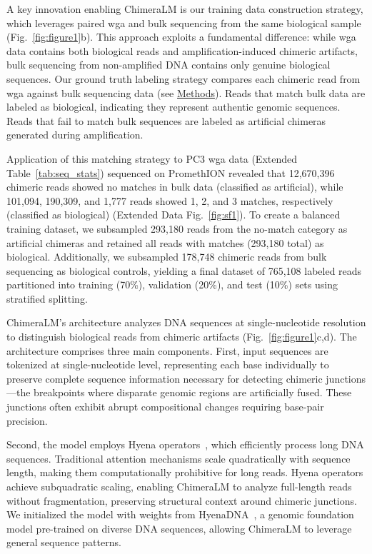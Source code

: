 \documentclass[pdflatex,sn-nature,lineno]{sn-jnl}%
\theoremstyle{thmstyleone}%
\theoremstyle{thmstyletwo}%
\theoremstyle{thmstylethree}%
\begin{document}
A key innovation enabling ChimeraLM is our training data construction strategy, which leverages paired \gls{wga} and bulk sequencing from the same biological sample (Fig.~\ref{fig:figure1}b).
This approach exploits a fundamental difference: while \gls{wga} data contains both biological reads and amplification-induced chimeric artifacts, bulk sequencing from non-amplified DNA contains only genuine biological sequences.
Our ground truth labeling strategy compares each chimeric read from \gls{wga} against bulk sequencing data (see \hyperref[sec:methods]{Methods}).
Reads that match bulk data are labeled as biological, indicating they represent authentic genomic sequences.
Reads that fail to match bulk sequences are labeled as artificial chimeras generated during amplification.

Application of this matching strategy to PC3 \gls{wga} data (Extended Table~\ref{tab:seq_stats}) sequenced on PromethION revealed that 12,670,396 chimeric reads showed no matches in bulk data (classified as artificial), while 101,094, 190,309, and 1,777 reads showed 1, 2, and 3 matches, respectively (classified as biological) (Extended Data Fig.~\ref{fig:sf1}).
To create a balanced training dataset, we subsampled 293,180 reads from the no-match category as artificial chimeras and retained all reads with matches (293,180 total) as biological.
Additionally, we subsampled 178,748 chimeric reads from bulk sequencing as biological controls, yielding a final dataset of 765,108 labeled reads partitioned into training (70\%), validation (20\%), and test (10\%) sets using stratified splitting.

ChimeraLM's architecture analyzes DNA sequences at single-nucleotide resolution to distinguish biological reads from chimeric artifacts (Fig.~\ref{fig:figure1}c,d).
The architecture comprises three main components.
First, input sequences are tokenized at single-nucleotide level, representing each base individually to preserve complete sequence information necessary for detecting chimeric junctions—the breakpoints where disparate genomic regions are artificially fused.
These junctions often exhibit abrupt compositional changes requiring base-pair precision.

Second, the model employs Hyena operators~\cite{Poli2023HyenaHT}, which efficiently process long DNA sequences.
Traditional attention mechanisms scale quadratically with sequence length, making them computationally prohibitive for long reads.
Hyena operators achieve subquadratic scaling, enabling ChimeraLM to analyze full-length reads without fragmentation, preserving structural context around chimeric junctions.
We initialized the model with weights from HyenaDNA~\cite{nguyen2023hyenadna}, a genomic foundation model pre-trained on diverse DNA sequences, allowing ChimeraLM to leverage general sequence patterns.
\end{document}
